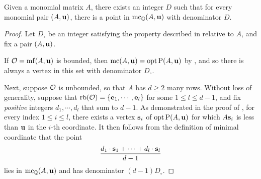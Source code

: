 \documentclass[11pt]{amsart}
\renewcommand{\!}[1]{{\color{red}\text{$\star$\,}#1\,$\star$}}
\begin{document}


\begin{theorem}  
\label{uniform denominators for mc:  T}
Given a monomial matrix $A$, there exists an integer $D$ such that for every monomial pair $(A, \mathbf{u})$, there is a point in $\operatorname{mc}_{\mathbb{Q}}(A, \mathbf{u})$ with denominator $D$.
\end{theorem}


\begin{proof}  Let $D_{\circ}$ be an integer satisfying the property described in  relative to $A$, and fix a pair $(A, \mathbf{u})$.  

If $\mathcal{O} = \operatorname{mf}(A, \mathbf{u})$ is bounded, then $\operatorname{mc}(A, \mathbf{u}) = \operatorname{opt} \mathrm{P}(A, \mathbf{u})$ by , and so there is always a vertex in this set with denominator $D_{\circ}$.  

Next,  suppose $\mathcal{O}$ is unbounded, so that $A$ has $d \geq 2$ many rows.  Without loss of generality, suppose that $\operatorname{rb}(\mathcal{O}) = \{ \mathbf{e}_1, \cdots, \mathbf{e}_l \}$ for some $1 \leq l \leq d-1$, and fix \emph{positive} integers $d_1, \cdots, d_l$ that sum to $d-1$.  As demonstrated in the  proof of , for every index  $1 \leq i \leq l$, there exists a vertex $\mathbf{s}_i$ of $\operatorname{opt} \mathrm{P}(A, \mathbf{u})$ for which $A \mathbf{s}_i$ is less than $\mathbf{u}$ in the $i$-th coordinate.  It then follows from the definition of minimal coordinate that the point \[  \frac{ d_1 \cdot \mathbf{s}_1 + \cdots + d_l \cdot  \mathbf{s}_l}{d-1}  \]
lies in $\operatorname{mc}_{\mathbb{Q}}(A, \mathbf{u})$ and has denominator $(d-1)D_{\circ}$.  
\end{proof}
\end{document}
